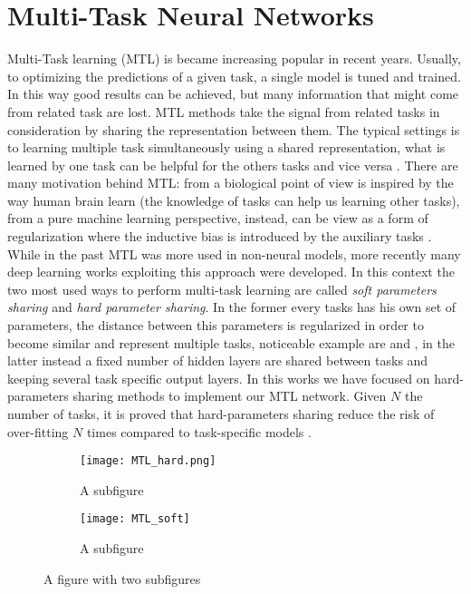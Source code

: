 \section{Multi-Task Neural Networks}\label{sec:MTLsection}
Multi-Task learning (MTL) is became increasing popular in recent years.
Usually, to optimizing the predictions of a given task, a single model is
tuned and trained. In this way good results can be achieved, but many
information that might come from related task are lost. MTL methods take
the signal from related tasks in consideration by sharing the
representation between them. The typical settings is to learning multiple
task simultaneously using a shared representation, what is learned by one
task can be helpful for the others tasks and vice versa \cite{Caruana97}.
There are many motivation behind MTL: from a biological point of view is
inspired by the way human brain learn (the knowledge of tasks can help us
learning other tasks), from a pure machine learning perspective, instead,
can be view as a form of regularization where the inductive bias is
introduced by the auxiliary tasks \cite{Ruder2017}. While in the past MTL
was more used in non-neural models, more recently many deep learning
works exploiting this approach were developed. In this context the two
most used ways to perform multi-task learning are called \emph{soft
parameters sharing} and \emph{hard parameter sharing}. In the former
every tasks has his own set of parameters, the distance between this
parameters is regularized in order to become similar and represent
multiple tasks, noticeable example are \cite{duong-etal-2015-low} and
\cite{yang2016trace}, in the latter instead a fixed number of hidden
layers are shared between tasks and keeping several task specific output
layers. In this works we have focused on hard-parameters sharing methods
to implement our MTL network. Given $N$ the number of tasks, it is proved
that hard-parameters sharing reduce the risk of over-fitting $N$ times
compared to task-specific models \cite{baxter1997}.
\begin{figure}
\centering
\begin{subfigure}{.5\textwidth}
  \centering
  \texttt{[image: MTL\_hard.png]}
  \caption{A subfigure}
  \label{fig:sub1}
\end{subfigure}%
\begin{subfigure}{.5\textwidth}
  \centering
  \texttt{[image: MTL\_soft]}
  \caption{A subfigure}
  \label{fig:sub2}
\end{subfigure}
\caption{A figure with two subfigures}
\label{fig:test}
\end{figure}

